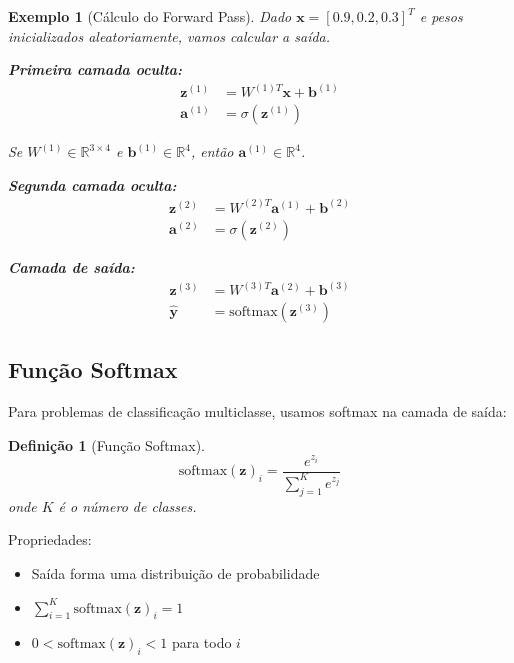 \documentclass[a4paper,12pt]{article}
\newtheorem{definicao}{Definição}[section]
\newtheorem{exemplo}{Exemplo}[section]
\begin{document}
\begin{exemplo}[Cálculo do Forward Pass]
Dado $\mathbf{x} = [0.9, 0.2, 0.3]^T$ e pesos inicializados aleatoriamente, vamos calcular a saída.

\textbf{Primeira camada oculta:}
\begin{align}
    \mathbf{z}^{(1)} &= W^{(1)T}\mathbf{x} + \mathbf{b}^{(1)} \\
    \mathbf{a}^{(1)} &= \sigma(\mathbf{z}^{(1)})
\end{align}

Se $W^{(1)} \in \mathbb{R}^{3 \times 4}$ e $\mathbf{b}^{(1)} \in \mathbb{R}^4$, então $\mathbf{a}^{(1)} \in \mathbb{R}^4$.

\textbf{Segunda camada oculta:}
\begin{align}
    \mathbf{z}^{(2)} &= W^{(2)T}\mathbf{a}^{(1)} + \mathbf{b}^{(2)} \\
    \mathbf{a}^{(2)} &= \sigma(\mathbf{z}^{(2)})
\end{align}

\textbf{Camada de saída:}
\begin{align}
    \mathbf{z}^{(3)} &= W^{(3)T}\mathbf{a}^{(2)} + \mathbf{b}^{(3)} \\
    \hat{\mathbf{y}} &= \text{softmax}(\mathbf{z}^{(3)})
\end{align}
\end{exemplo}

\subsection{Função Softmax}

Para problemas de classificação multiclasse, usamos softmax na camada de saída:

\begin{definicao}[Função Softmax]
\begin{equation}
    \text{softmax}(\mathbf{z})_i = \frac{e^{z_i}}{\sum_{j=1}^{K} e^{z_j}}
\end{equation}
onde $K$ é o número de classes.
\end{definicao}

Propriedades:
\begin{itemize}
    \item Saída forma uma distribuição de probabilidade
    \item $\sum_{i=1}^{K} \text{softmax}(\mathbf{z})_i = 1$
    \item $0 < \text{softmax}(\mathbf{z})_i < 1$ para todo $i$
\end{itemize}
\end{document}
